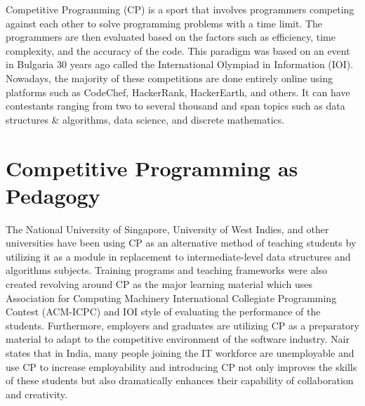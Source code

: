 Competitive Programming (CP) is a sport that involves programmers competing 
against each other to solve programming problems with a time limit. The programmers 
are then evaluated based on the factors such as efficiency, time complexity, 
and the accuracy of the code.\cite{majumdar2017macacm} This paradigm was based on an 
event in Bulgaria 30 years ago called the International Olympiad in Information (IOI). 
Nowadays, the majority of these competitions are done entirely online using platforms 
such as CodeChef, HackerRank, HackerEarth, and others. It can have contestants ranging 
from two to several thousand and span topics such as data structures \& algorithms, data science, and discrete mathematics\cite{nair2020increasing}.

\section{Competitive Programming as Pedagogy}

The National University of Singapore, University of West Indies, 
and other universities have been using CP as an alternative method 
of teaching students by utilizing it as a module in replacement to intermediate-level data structures and algorithms subjects\cite{coore2019facilitating}. 
Training programs\cite{di2018learning} and teaching frameworks\cite{di2018framework} 
were also created revolving around CP as the major learning material which uses Association 
for Computing Machinery International Collegiate Programming Contest (ACM-ICPC) and IOI 
style of evaluating the performance of the students.  Furthermore, employers and graduates 
are utilizing CP as a preparatory material to adapt to the competitive environment of the 
software industry.\cite{nair2020increasing} Nair states that in India, many people joining the IT 
workforce are unemployable and use CP to increase employability and  introducing CP not 
only improves the skills of these students but also dramatically enhances their capability  of collaboration and creativity.